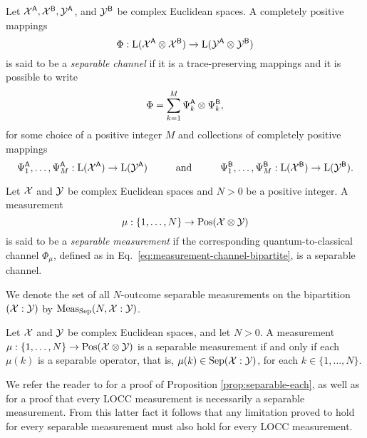 \begin{definition}
Let $\mathcal{X}^{\mathsf{A}}, \mathcal{X}^{\mathsf{B}}, \mathcal{Y}^{\mathsf{A}}$, and $\mathcal{Y}^{\mathsf{B}}$ be complex
Euclidean spaces.
A completely positive mappings 
\[
  \Phi:\mathrm{L}(\mathcal{X}^{\mathsf{A}}\otimes\mathcal{X}^{\mathsf{B}})\to\mathrm{L}(\mathcal{Y}^{\mathsf{A}}\otimes\mathcal{Y}^{\mathsf{B}})
\]
is said to be a 
\emph{separable channel} if it is a trace-preserving mappings and it is possible 
to write
\begin{equation}
  \Phi = \sum_{k = 1}^{M}\Psi_{k}^{\mathsf{A}}\otimes\Psi_{k}^{\mathsf{B}},
\end{equation}
for some choice of a positive integer $M$ and collections of
completely positive mappings 
\begin{equation}
  \Psi_1^{\mathsf{A}},\ldots,\Psi_{M}^{\mathsf{A}} : \mathrm{L}(\mathcal{X}^{\mathsf{A}})\to\mathrm{L}(\mathcal{Y}^{\mathsf{A}})
  \hspace*{1cm}\mbox{and}\hspace*{1cm}
  \Psi_1^{\mathsf{B}},\ldots,\Psi_{M}^{\mathsf{B}} : \mathrm{L}(\mathcal{X}^{\mathsf{B}})\to\mathrm{L}(\mathcal{Y}^{\mathsf{B}}).
\end{equation}
\end{definition}

\begin{definition}
Let $\mathcal{X}$ and $\mathcal{Y}$ be complex Euclidean spaces and $N > 0$ be a positive integer. 
A measurement
\begin{equation}
  \mu: \{1, \ldots, N \} \rightarrow \mathrm{Pos}(\mathcal{X}\otimes\mathcal{Y})
\end{equation}
is said to be a \emph{separable measurement} if the 
corresponding quantum-to-classical channel $\Phi_{\mu}$, defined as in 
Eq.~\eqref{eq:measurement-channel-bipartite}, is a separable channel.
\end{definition}

We denote the set of all $N$-outcome separable measurements on the bipartition 
$(\mathcal{X}:\mathcal{Y})$ by $\mathrm{Meas}_{\mathrm{Sep}}(N, \mathcal{X}:\mathcal{Y})$.

\begin{prop}
\label{prop:separable-each}
Let $\mathcal{X}$ and $\mathcal{Y}$ be complex Euclidean spaces, and let $N > 0$. A measurement 
$\mu : \{1,\ldots,N\}\to\mathrm{Pos}(\mathcal{X}\otimes\mathcal{Y})$ is a separable measurement 
if and only if each $\mu(k)$ is a separable operator, that is, 
$\mu(k)\in \mathrm{Sep}(\mathcal{X}:\mathcal{Y})$, for each $k\in\{1, \ldots, N\}$.
\end{prop}

We refer the reader to \cite{Watrous15} for a proof of Proposition \ref{prop:separable-each},
as well as for a proof that every LOCC measurement is necessarily a separable measurement. 
From this latter fact it follows that any limitation proved to hold for 
every separable measurement must also hold for every LOCC measurement.

